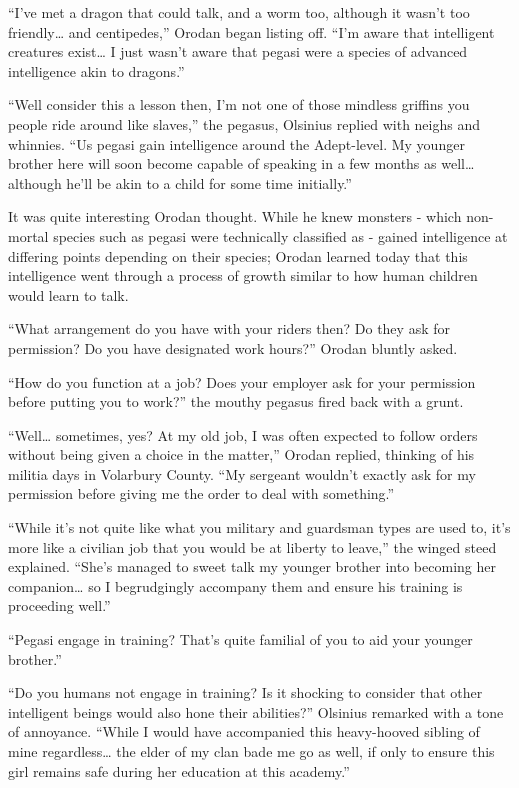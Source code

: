 \documentclass[a4paper,10pt]{book}
\begin{document}
“I’ve met a dragon that could talk, and a worm too, although it wasn’t too friendly… and centipedes,” Orodan began listing off. “I’m aware that intelligent creatures exist… I just wasn’t aware that pegasi were a species of advanced intelligence akin to dragons.”\par
“Well consider this a lesson then, I’m not one of those mindless griffins you people ride around like slaves,” the pegasus, Olsinius replied with neighs and whinnies. “Us pegasi gain intelligence around the Adept-level. My younger brother here will soon become capable of speaking in a few months as well… although he’ll be akin to a child for some time initially.”\par
It was quite interesting Orodan thought. While he knew monsters - which non-mortal species such as pegasi were technically classified as - gained intelligence at differing points depending on their species; Orodan learned today that this intelligence went through a process of growth similar to how human children would learn to talk.\par
“What arrangement do you have with your riders then? Do they ask for permission? Do you have designated work hours?” Orodan bluntly asked.\par
“How do you function at a job? Does your employer ask for your permission before putting you to work?” the mouthy pegasus fired back with a grunt.\par
“Well… sometimes, yes? At my old job, I was often expected to follow orders without being given a choice in the matter,” Orodan replied, thinking of his militia days in Volarbury County. “My sergeant wouldn’t exactly ask for my permission before giving me the order to deal with something.”\par
“While it’s not quite like what you military and guardsman types are used to, it’s more like a civilian job that you would be at liberty to leave,” the winged steed explained. “She’s managed to sweet talk my younger brother into becoming her companion… so I begrudgingly accompany them and ensure his training is proceeding well.”\par
“Pegasi engage in training? That’s quite familial of you to aid your younger brother.”\par
“Do you humans not engage in training? Is it shocking to consider that other intelligent beings would also hone their abilities?” Olsinius remarked with a tone of annoyance. “While I would have accompanied this heavy-hooved sibling of mine regardless… the elder of my clan bade me go as well, if only to ensure this girl remains safe during her education at this academy.”\par
\end{document}
